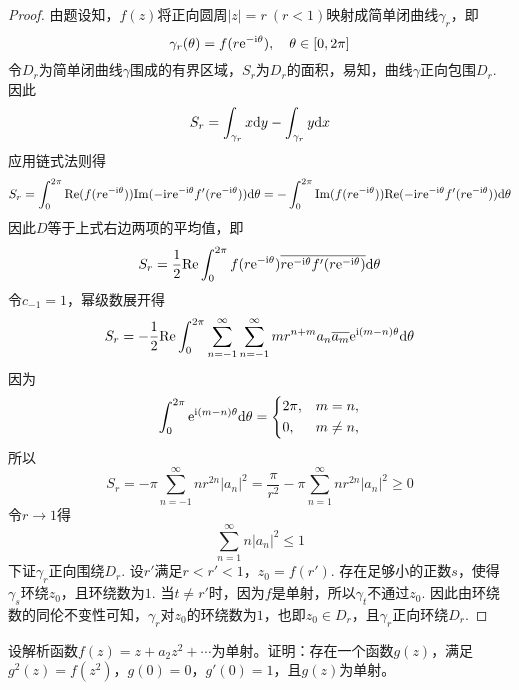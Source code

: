 \begin{proof}
    
    由题设知，$f(z)$将正向圆周$|z| = r\ (r < 1)$映射成简单闭曲线$\gamma_r$，即
    \[\gamma_r(\theta) = f(r\mathrm{e}^{-\mathrm{i} \theta}), \quad \theta \in [0, 2\pi]\]
    令$D_r$为简单闭曲线$\gamma$围成的有界区域，$S_r$为$D_r$的面积，易知，曲线$\gamma$正向包围$D_r$. \\
    因此
    \[S_r = \int_{\gamma_r}{x}\mathrm{d} y - \int_{\gamma_r}{y}\mathrm{d} x\]
    应用链式法则得
    \[S_r = \int_{0}^{2\pi}{\mathrm{Re}(f(r \mathrm{e}^{-\mathrm{i} \theta})) \mathrm{Im}(-\mathrm{i} r \mathrm{e}^{-\mathrm{i} \theta} f'(r \mathrm{e}^{-\mathrm{i} \theta}))} \mathrm{d} \theta = -\int_{0}^{2\pi}{\mathrm{Im}(f(r \mathrm{e}^{-\mathrm{i} \theta})) \mathrm{Re}(-\mathrm{i} r \mathrm{e}^{-\mathrm{i} \theta} f'(r \mathrm{e}^{-\mathrm{i} \theta}))} \mathrm{d} \theta\]
    因此$D$等于上式右边两项的平均值，即
    \[S_r = \dfrac{1}{2} \mathrm{Re}\int_{0}^{2\pi}{f(r \mathrm{e}^{-\mathrm{i} \theta}) \overline{r \mathrm{e}^{-\mathrm{i} \theta} f'(r \mathrm{e}^{-\mathrm{i} \theta})}} \mathrm{d} \theta\]
    令$c_{-1} = 1$，幂级数展开得
    \[S_r = -\dfrac{1}{2}\mathrm{Re}\int_{0}^{2\pi}{\sum\limits_{n = -1}^{\infty}{\sum\limits_{n = -1}^{\infty}{m r^{n + m}a_n \overline{a_m} \mathrm{e}^{\mathrm{i} (m - n)\theta}}}}\mathrm{d} \theta\]
    因为
    $$\int_{0}^{2\pi}{\mathrm{e}^{\mathrm{i}(m - n)\theta}}\mathrm{d} \theta = \left\{
        \begin{aligned}
            & 2\pi, & m = n, \\
            & 0, & m \neq n,           
        \end{aligned}
    \right.$$
    所以
    \[S_r = - \pi\sum\limits_{n = -1}^{\infty}{nr^{2n}|a_n|^2} = \dfrac{\pi}{r^2} - \pi\sum\limits_{n = 1}^{\infty}{nr^{2n}|a_n|^2} \geq 0\]
    令$r \to 1$得
    \[\sum\limits_{n = 1}^{\infty}{n|a_n|^2} \leq 1\]
    下证$\gamma_r$正向围绕$D_r$. 设$r'$满足$r < r' < 1$，$z_0 = f(r')$. 存在足够小的正数$s$，使得$\gamma_s$环绕$z_0$，且环绕数为$1$. 当$t \neq r'$时，因为$f$是单射，所以$\gamma_t$不通过$z_0$. 因此由环绕数的同伦不变性可知，$\gamma_r$对$z_0$的环绕数为$1$，也即$z_0 \in D_r$，且$\gamma_r$正向环绕$D_r$.

\end{proof}

\begin{lemma}\label{lemma:complex}

    设解析函数$f(z) = z + a_2 z^2 + \cdots$为单射。证明：存在一个函数$g(z)$，满足$g^2(z) = f(z^2)$，$g(0) = 0$，$g'(0) = 1$，且$g(z)$为单射。

\end{lemma}

